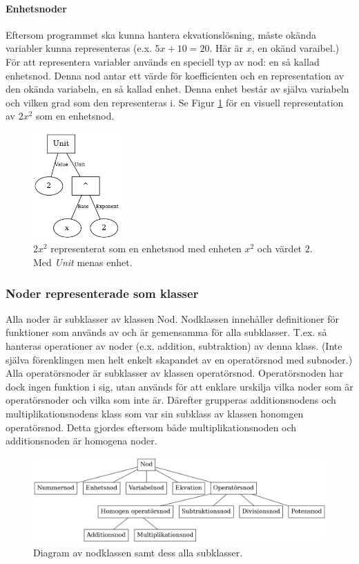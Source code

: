 \documentclass[12pt,a4paper]{article}
\begin{document}
\paragraph{Enhetsnoder}
Eftersom programmet ska kunna hantera ekvationslösning, måste okända variabler kunna representeras (e.x. \(5x + 10 = 20\). Här är \(x\), en okänd varaibel.) För att representera variabler används en speciell typ av nod: en så kallad enhetsnod. Denna nod antar ett värde för koefficienten och en representation av den okända variabeln, en så kallad enhet. Denna enhet består av själva variabeln och vilken grad som den representeras i. Se Figur \ref{fig:2132} för en visuell representation av \(2x^{2}\) som en enhetsnod.
\begin{figure}[H]
	\centering
	\includegraphics[width=0.3\textwidth]{image25}
	\caption{\(2x^{2}\) representerat som en enhetsnod med enheten \(x^{2}\) och värdet \(2\). Med \textit{Unit} menas enhet.}
	\label{fig:2132}
\end{figure}
\subsubsection{Noder representerade som klasser}
Alla noder är subklasser av klassen Nod. Nodklassen innehåller definitioner för funktioner som används av och är gemensamma för alla subklasser. T.ex. så hanteras operationer av noder (e.x. addition, subtraktion) av denna klass. (Inte själva förenklingen men helt enkelt skapandet av en operatörsnod med subnoder.) Alla operatörsnoder är subklasser av klassen operatörsnod. Operatörsnoden har dock ingen funktion i sig, utan används för att enklare urskilja vilka noder som är operatörsnoder och vilka som inte är. Därefter grupperas additionsnodens och multiplikationsnodens klass som var sin subklass av klassen honomgen operatörsnod. Detta gjordes eftersom både multiplikationsnoden och additionsnoden är homogena noder.
\begin{figure}[H]
  \center
  \includegraphics[width=1\textwidth]{image20}
  \caption{Diagram av nodklassen samt dess alla subklasser.}
\end{figure}
\end{document}
